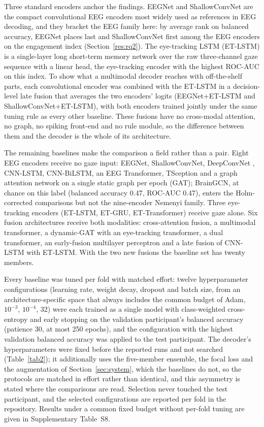 Three standard encoders anchor the findings. EEGNet \cite{ref50} and ShallowConvNet \cite{ref51} are the compact convolutional EEG encoders most widely used as references in EEG decoding, and they bracket the EEG family here: by average rank on balanced accuracy, EEGNet places last and ShallowConvNet first among the EEG encoders on the engagement index (Section~\ref{res:rq2}). The eye-tracking LSTM (ET-LSTM) is a single-layer long short-term memory network over the raw three-channel gaze sequence with a linear head, the eye-tracking encoder with the highest ROC-AUC on this index. To show what a multimodal decoder reaches with off-the-shelf parts, each convolutional encoder was combined with the ET-LSTM in a decision-level late fusion that averages the two encoders' logits (EEGNet+ET-LSTM and ShallowConvNet+ET-LSTM), with both encoders trained jointly under the same tuning rule as every other baseline. These fusions have no cross-modal attention, no graph, no spiking front-end and no rule module, so the difference between them and the decoder is the whole of its architecture.

The remaining baselines make the comparison a field rather than a pair. Eight EEG encoders receive no gaze input: EEGNet, ShallowConvNet, DeepConvNet \cite{ref51}, CNN-LSTM, CNN-BiLSTM, an EEG Transformer, TSception \cite{ref52} and a graph attention network on a single static graph per epoch (GAT); BrainGCN, at chance on this label (balanced accuracy 0.47, ROC-AUC 0.47), enters the Holm-corrected comparisons but not the nine-encoder Nemenyi family. Three eye-tracking encoders (ET-LSTM, ET-GRU, ET-Transformer) receive gaze alone. Six fusion architectures receive both modalities: cross-attention fusion, a multimodal transformer, a dynamic-GAT with an eye-tracking transformer, a dual transformer, an early-fusion multilayer perceptron and a late fusion of CNN-LSTM with ET-LSTM. With the two new fusions the baseline set has twenty members.

Every baseline was tuned per fold with matched effort: twelve hyperparameter configurations (learning rate, weight decay, dropout and batch size, from an architecture-specific space that always includes the common budget of Adam, $10^{-3}$, $10^{-4}$, 32) were each trained as a single model with class-weighted cross-entropy and early stopping on the validation participant's balanced accuracy (patience 30, at most 250 epochs), and the configuration with the highest validation balanced accuracy was applied to the test participant. The decoder's hyperparameters were fixed before the reported runs and not searched (Table~\ref{tab2}); it additionally uses the five-member ensemble, the focal loss and the augmentation of Section~\ref{sec:system}, which the baselines do not, so the protocols are matched in effort rather than identical, and this asymmetry is stated where the comparisons are read. Selection never touched the test participant, and the selected configurations are reported per fold in the repository. Results under a common fixed budget without per-fold tuning are given in Supplementary Table~S8.

